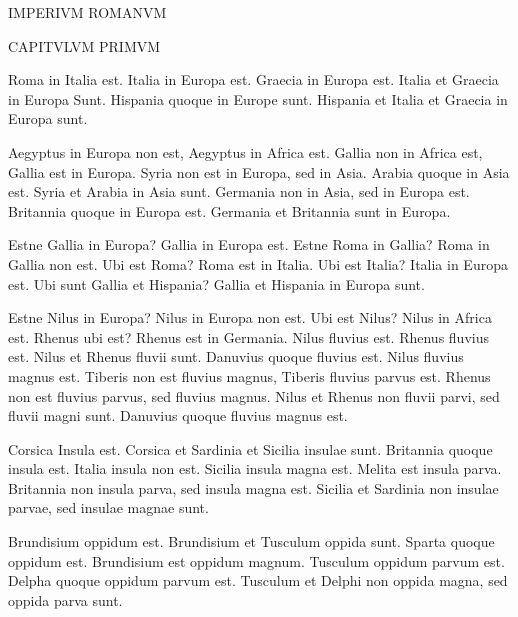 \documentclass[a4paper]{article}
\begin{document}
\begin{center}
	\huge{IMPERIVM ROMANVM}

	\large{CAPITVLVM PRIMVM}
\end{center}
Roma in Italia est. 
Italia in Europa est. Graecia in Europa est. Italia et Graecia in Europa Sunt. 
Hispania quoque in Europe sunt. Hispania et Italia et Graecia in Europa sunt. 

Aegyptus in Europa non est, Aegyptus in Africa est. Gallia non in Africa est, Gallia est in Europa.
Syria non est in Europa, sed in Asia. Arabia quoque in Asia est. Syria et Arabia in Asia sunt.
Germania non in Asia, sed in Europa est. Britannia quoque in Europa est. Germania et Britannia sunt
in Europa.

Estne Gallia in Europa? Gallia in Europa est. 
Estne Roma in Gallia? Roma in Gallia non est. Ubi est Roma?
Roma est in Italia. Ubi est Italia? Italia in Europa est. Ubi sunt Gallia et Hispania? Gallia et Hispania
in Europa sunt.

Estne Nilus in Europa? Nilus in Europa non est. Ubi est Nilus? Nilus in Africa est. Rhenus ubi est? Rhenus est
in Germania. 
Nilus fluvius est. Rhenus fluvius est. Nilus et Rhenus fluvii sunt. Danuvius quoque fluvius est.
Nilus fluvius magnus est. Tiberis non est fluvius magnus, Tiberis fluvius parvus est. Rhenus non est fluvius
parvus, sed fluvius magnus. Nilus et Rhenus non fluvii parvi, sed fluvii magni sunt. Danuvius quoque fluvius
magnus est.


Corsica Insula est. Corsica et Sardinia et Sicilia insulae sunt. Britannia quoque insula est. Italia insula non
est. Sicilia insula magna est. Melita est insula parva. Britannia non insula parva, sed insula magna est.
Sicilia et Sardinia non insulae parvae, sed insulae magnae sunt. 

Brundisium oppidum est. Brundisium et Tusculum oppida sunt. Sparta quoque oppidum est. Brundisium est oppidum magnum. 
Tusculum oppidum parvum est. Delpha quoque oppidum parvum est. Tusculum et Delphi non oppida magna, sed oppida parva sunt.
\end{document}
